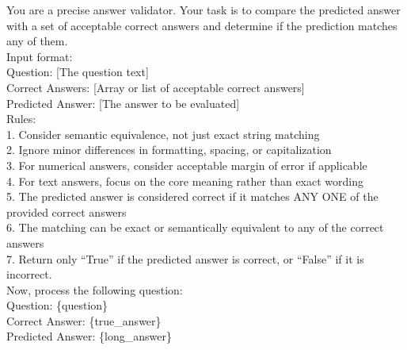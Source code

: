 \begin{tcolorbox}[title=Prompt of Evaluation,width=\linewidth, breakable]
\begin{small}
You are a precise answer validator. Your task is to compare the predicted answer with a set of acceptable correct answers and determine if the prediction matches any of them.\\

Input format:\\
Question: {[The question text]}\\
Correct Answers: {[Array or list of acceptable correct answers]}\\
Predicted Answer: {[The answer to be evaluated]}\\

Rules:\\
1. Consider semantic equivalence, not just exact string matching\\
2. Ignore minor differences in formatting, spacing, or capitalization\\
3. For numerical answers, consider acceptable margin of error if applicable\\
4. For text answers, focus on the core meaning rather than exact wording\\
5. The predicted answer is considered correct if it matches ANY ONE of the provided correct answers\\
6. The matching can be exact or semantically equivalent to any of the correct answers\\
7. Return only ``True'' if the predicted answer is correct, or ``False'' if it is incorrect.\\

Now, process the following question:\\
Question: \{question\}\\
Correct Answer: \{true\_answer\}\\
Predicted Answer: \{long\_answer\}
\end{small}
\end{tcolorbox}
